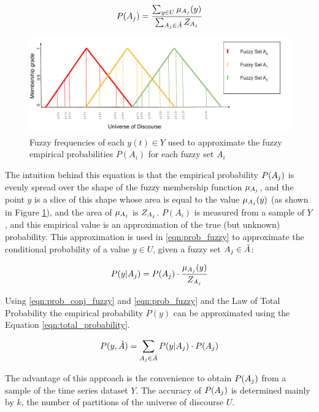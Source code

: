 \begin{equation}
P(A_j) = \frac{\sum_{y \in U} \mu_{A_j}(y)}{\sum_{A_j \in \tilde{A}}Z_{A_j}} 
\label{eqn:prob_conj_fuzzy}
\end{equation}

\begin{figure}
    \centering
    \includegraphics[width=\textwidth]{figures/pwfts_fuzzyfrequency.pdf}
    \caption{Fuzzy frequencies of each $y(t) \in Y$ used to approximate the fuzzy empirical probabilities $P(A_i)$ for each fuzzy set $A_i$}
    \label{fig:pwfts_fuzzyfrequency}
\end{figure}

The intuition behind this equation is that the empirical probability $P(A_j)$ is evenly spread over the shape of the fuzzy membership function $\mu_{A_j}$, and the point $y$ is a slice of this shape whose area is equal to the value $\mu_{A_j}(y)$ (as shown in Figure \ref{fig:pwfts_fuzzyfrequency}), and the area of $\mu_{A_j}$ is $Z_{A_j}$. $P(A_i)$ is measured from a sample of $Y$, and this empirical value is an approximation of the true (but unknown) probability. This approximation is used in \eqref{eqn:prob_fuzzy} to approximate the conditional probability of a value $y \in U$, given a fuzzy set $A_j \in \tilde{A}$:

\begin{equation}
P(y | A_j) = P(A_j) \cdot \frac{\mu_{A_j}(y)}{Z_{A_j}}
\label{eqn:prob_fuzzy}
\end{equation}

Using \eqref{eqn:prob_conj_fuzzy} and \eqref{eqn:prob_fuzzy} and the Law of Total Probability the empirical probability $P(y)$ can be approximated using the Equation \eqref{eqn:total_probability}. 

\begin{equation}
P(y,\tilde{A}) = \sum_{A_j \in \tilde{A}} P(y | A_j)\cdot P(A_j)
\label{eqn:total_probability}
\end{equation}

The advantage of this approach is the convenience to obtain $P(A_j)$ from a sample of the time series dataset $Y$. The accuracy of $P(A_j)$ is determined mainly by $k$, the number of partitions of the universe of discourse $U$.


